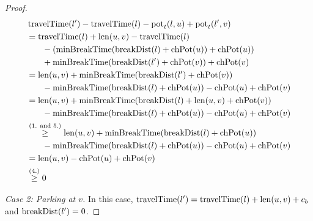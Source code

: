 \begin{proof}
	\begin{align}
		\begin{split}\label{eq:label_feasibility_proof_1}
			&\concretett(l') - \concretett(l) - \concretepotential_t(l,u) + \concretepotential_t(l',v)\\
			&= \concretett(l) + \len(u,v) - \concretett(l)\\
			& \phantom{{}=1} - (\minBreakTime(\breakDist(l)+\chpotential(u)) + \chpotential(u))\\
			& \phantom{{}=1} + \minBreakTime(\breakDist(l')+\chpotential(v)) + \chpotential(v)\\
			&= \len(u,v) + \minBreakTime(\breakDist(l')+\chpotential(v))\\
			& \phantom{{}=1} - \minBreakTime(\breakDist(l)+\chpotential(u)) - \chpotential(u) + \chpotential(v)\\
			&= \len(u,v) + \minBreakTime(\breakDist(l) + \len(u,v) + \chpotential(v))\\
			& \phantom{{}=1} - \minBreakTime(\breakDist(l)+\chpotential(u)) - \chpotential(u) + \chpotential(v) \\
			&\stackrel{\text{(1. and 5.)}}{\ge} \len(u,v) + \minBreakTime(\breakDist(l) + \chpotential(u))\\
			& \phantom{{}=1} - \minBreakTime(\breakDist(l)+\chpotential(u)) - \chpotential(u) + \chpotential(v) \\
			&= \len(u,v) - \chpotential(u) + \chpotential(v)\\
			&\stackrel{\text{(4.)}}{\ge} 0
		\end{split}
	\end{align}

	\emph{Case 2: Parking at $v$.} In this case, $\operatorname{travelTime}(l') = \operatorname{travelTime}(l) + \operatorname{len}(u,v) + c_b$ and $\operatorname{breakDist}(l') = 0$.


\end{proof}
